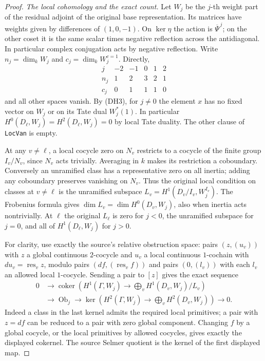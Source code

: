 \begin{proof}
\emph{The local cohomology and the exact count.}
Let $W_j$ be the $j$-th weight part of the residual adjoint of the
original base representation.  Its matrices have weights given by
differences of $(1,0,-1)$.  On $\ker\eta$ the action is
$\overline\Psi^{\,j}$; on the other coset it is the same scalar
times negative reflection across the antidiagonal.
In particular complex conjugation acts by negative reflection.
Write $n_j=\dim_k W_j$ and $c_j=\dim_k W_j^{c=1}$.  Directly,
\[
\begin{array}{c|rrrrr}
 j&-2&-1&0&1&2\\ \hline
 n_j&1&2&3&2&1\\
 c_j&0&1&1&1&0
\end{array}                                                     \tag{DH4}
\]
and all other spaces vanish.  By (DH3), for $j\ne0$ the element
$x$ has no fixed vector on $W_j$ or on its Tate dual $W_j^*(1)$.
In particular $H^0(D_\ell,W_j)=H^2(D_\ell,W_j)=0$ by local
Tate duality.  The other clause of \texttt{LocVan} is empty.

At any $v\ne\ell$, a local cocycle zero on $N_v$ restricts to a
cocycle of the finite group $I_v/N_v$, since $N_v$ acts trivially.
Averaging in $k$ makes its restriction a coboundary.  Conversely
an unramified class has a representative zero on all inertia;
adding any coboundary preserves vanishing on $N_v$.  Thus the
original local condition on classes at $v\ne\ell$ is the
unramified subspace $L_v=H^1(D_v/I_v,W_j^{I_v})$.
The Frobenius formula gives $\dim L_v=\dim H^0(D_v,W_j)$,
also when inertia acts nontrivially.  At $\ell$ the original
$L_\ell$ is zero for $j<0$, the unramified subspace for $j=0$,
and all of $H^1(D_\ell,W_j)$ for $j>0$.

For clarity, use exactly the source's relative obstruction space:
pairs $(z,(u_v))$ with $z$ a global continuous $2$-cocycle and
$u_v$ a local continuous $1$-cochain with $du_v=\operatorname{res}_v z$,
modulo pairs $(df,(\operatorname{res}_v f))$ and pairs
$(0,(l_v))$ with each $l_v$ an allowed local $1$-cocycle.
Sending a pair to $[z]$ gives the exact sequence
\[
 \begin{aligned}
 0&\to\operatorname{coker}\left(H^1(\Gamma,W_j)\longrightarrow
                  \bigoplus_v H^1(D_v,W_j)/L_v\right)\\
 &\to\operatorname{Ob}_j\to
 \ker\left(H^2(\Gamma,W_j)\longrightarrow
                  \bigoplus_v H^2(D_v,W_j)\right)\to0.
 \end{aligned}
\]
Indeed a class in the last kernel admits the required local primitives;
a pair with $z=df$ can be reduced to a pair with zero global
component.  Changing $f$ by a global cocycle, or the local
primitives by allowed cocycles, gives exactly the displayed cokernel.
The source Selmer quotient is the kernel of the first displayed map.


\end{proof}
